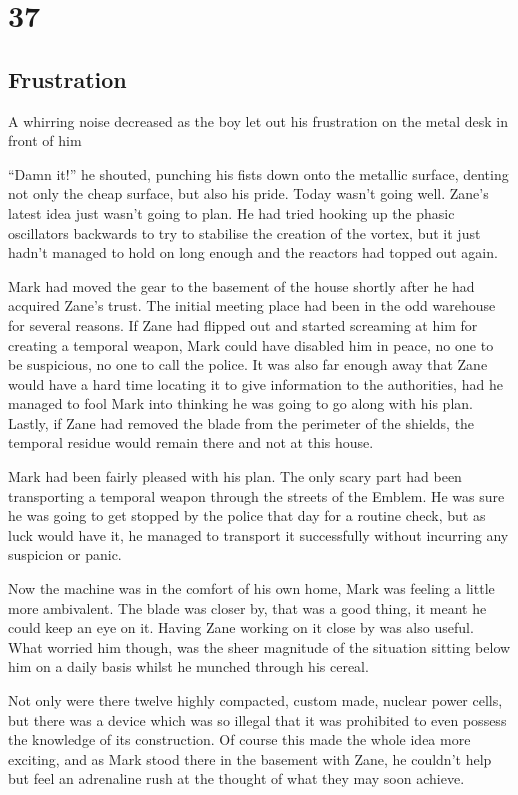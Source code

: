 \chapter{37}
\section{Frustration}


A whirring noise decreased as the boy let out his frustration on the metal desk in front of him

``Damn it!'' he shouted, punching his fists down onto the metallic surface, denting not only the cheap surface, but also his pride.  Today wasn't going well.  Zane's latest idea just wasn't going to plan.  He had tried hooking up the phasic oscillators backwards to try to stabilise the creation of the vortex, but it just hadn't managed to hold on long enough and the reactors had topped out again.

Mark had moved the gear to the basement of the house shortly after he had acquired Zane's trust.  The initial meeting place had been in the odd warehouse for several reasons.  If Zane had flipped out and started screaming at him for creating a temporal weapon, Mark could have disabled him in peace, no one to be suspicious, no one to call the police.  It was also far enough away that Zane would have a hard time locating it to give information to the authorities, had he managed to fool Mark into thinking he was going to go along with his plan.  Lastly, if Zane had removed the blade from the perimeter of the shields, the temporal residue would remain there and not at this house.

Mark had been fairly pleased with his plan.  The only scary part had been transporting a temporal weapon through the streets of the Emblem.  He was sure he was going to get stopped by the police that day for a routine check, but as luck would have it, he managed to transport it successfully without incurring any suspicion or panic.

Now the machine was in the comfort of his own home, Mark was feeling a little more ambivalent.  The blade was closer by, that was a good thing, it meant he could keep an eye on it.  Having Zane working on it close by was also useful.  What worried him though, was the sheer magnitude of the situation sitting below him on a daily basis whilst he munched through his cereal.

Not only were there twelve highly compacted, custom made, nuclear power cells, but there was a device which was so illegal that it was prohibited to even possess the knowledge of its construction.  Of course this made the whole idea more exciting, and as Mark stood there in the basement with Zane, he couldn't help but feel an adrenaline rush at the thought of what they may soon achieve.

